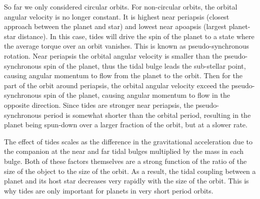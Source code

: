 So far we only considered circular orbits. For non-circular orbits, the orbital
angular velocity is no longer constant. It is highest near periapsis (closest
approach between the planet and star) and lowest near apoapsis (largest
planet-star distance). In this case, tides will drive the spin of the planet to
a state where the average torque over an orbit vanishes. This is known as
pseudo-synchronous rotation. Near periapsis the orbital angular velocity is
smaller than the pseudo-synchronous spin of the planet, thus the tidal bulge
leads the sub-stellar point, causing angular momentum to flow from the planet to
the orbit. Then for the part of the orbit around periapsis, the orbital angular
velocity exceed the pseudo-synchronous spin of the planet, causing angular
momentum to flow in the opposite direction. Since tides are stronger near
periapsis, the pseudo-synchronous period is somewhat shorter than the orbital
period, resulting in the planet being spun-down over a larger fraction of the
orbit, but at a slower rate.

The effect of tides scales as the difference in the gravitational acceleration
due to the companion at the near and far tidal bulges multiplied by the mass in
each bulge. Both of these factors themselves are a strong function of the ratio
of the size of the object to the size of the orbit. As a result, the tidal
coupling between a planet and its host star decreases very rapidly with the size
of the orbit. This is why tides are only important for planets in very short
period orbits.
